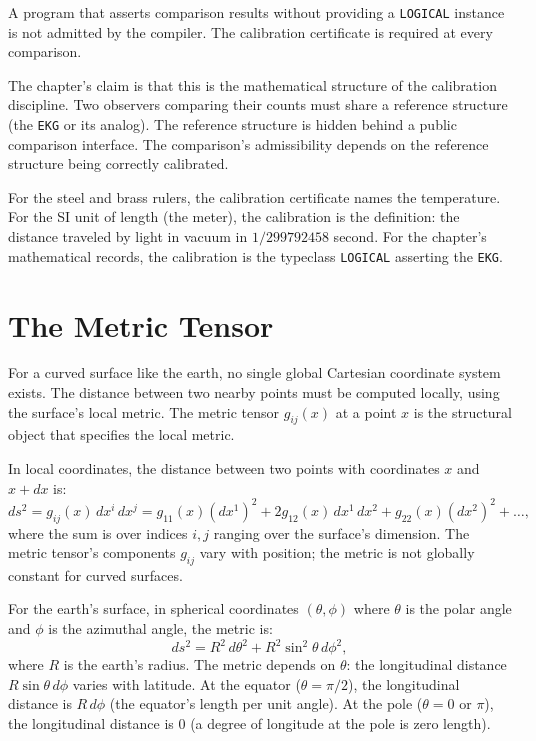 A program that asserts comparison results without providing a
\texttt{LOGICAL} instance is not admitted by the compiler. The
calibration certificate is required at every comparison.

The chapter's claim is that this is the mathematical structure of
the calibration discipline. Two observers comparing their counts
must share a reference structure (the \texttt{EKG} or its
analog). The reference structure is hidden behind a public
comparison interface. The comparison's admissibility depends on
the reference structure being correctly calibrated.

For the steel and brass rulers, the calibration certificate names
the temperature. For the SI unit of length (the meter), the
calibration is the definition: the distance traveled by light in
vacuum in $1/299792458$ second. For the chapter's mathematical
records, the calibration is the typeclass \texttt{LOGICAL}
asserting the \texttt{EKG}.

\section{The Metric Tensor}
\label{se:the-metric-tensor}

For a curved surface like the earth, no single global Cartesian
coordinate system exists. The distance between two nearby points
must be computed locally, using the surface's local metric. The
metric tensor $g_{ij}(x)$ at a point $x$ is the structural object
that specifies the local metric.

In local coordinates, the distance between two points with
coordinates $x$ and $x + dx$ is:
\[
ds^2 = g_{ij}(x) \, dx^i \, dx^j = g_{11}(x) (dx^1)^2 + 2 g_{12}(x)
\, dx^1 \, dx^2 + g_{22}(x) (dx^2)^2 + \ldots,
\]
where the sum is over indices $i, j$ ranging over the surface's
dimension. The metric tensor's components $g_{ij}$ vary with
position; the metric is not globally constant for curved surfaces.

For the earth's surface, in spherical coordinates $(\theta,
\phi)$ where $\theta$ is the polar angle and $\phi$ is the
azimuthal angle, the metric is:
\[
ds^2 = R^2 \, d\theta^2 + R^2 \sin^2\theta \, d\phi^2,
\]
where $R$ is the earth's radius. The metric depends on $\theta$:
the longitudinal distance $R \sin\theta \, d\phi$ varies with
latitude. At the equator ($\theta = \pi/2$), the longitudinal
distance is $R \, d\phi$ (the equator's length per unit angle).
At the pole ($\theta = 0$ or $\pi$), the longitudinal distance
is $0$ (a degree of longitude at the pole is zero length).

